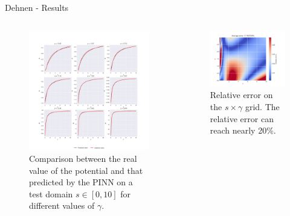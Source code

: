 \begin{frame}{Dehnen - Results}
    \begin{columns}
    \column{\moit}
        \begin{figure}
            \centering
            \includegraphics[width=\textwidth]{imgs/test-plot-dehnen.png}
            \caption{Comparison between the real value of the potential and that predicted by the PINN on a test domain $s \in [0, 10]$ for different values of $\gamma$.}
            \label{fig:test-plot-dehnen}
        \end{figure}
    \column{\moit} 
        \begin{figure}
            \centering
            \includegraphics[width=\textwidth]{imgs/relative-error-dehnen.png}
            \caption{Relative error on the $s \times \gamma$ grid. The relative error can reach nearly 20\%.}
            \label{fig:relative-error-dehnen}
        \end{figure}
    \end{columns}
\end{frame}



